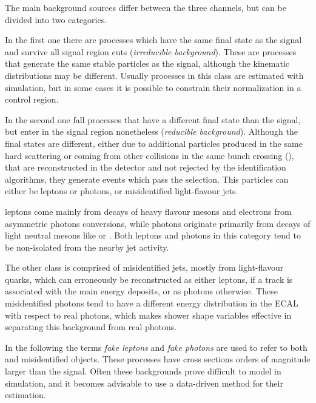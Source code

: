 \label{sec:backgrounds}
The main background sources differ between the three channels, but can be divided into two categories.

In the first one there are processes which have the same final state as the signal and survive all signal region cuts (\textit{irreducible background}).
These are processes that generate the same stable particles as the signal,
although the kinematic distributions may be different.
Usually processes in this class are estimated with simulation,
but in some cases it is possible to constrain their normalization in a control region.

In the second one fall processes that have a different final state than the signal, but enter in the signal region nonetheless (\textit{reducible background}).
Although the final states are different,
either due to additional particles produced in the same hard scattering
or coming from other collisions in the same bunch crossing (\pileup),
that are reconstructed in the detector and not rejected by the identification algorithms,
they generate events which pass the selection.
This particles can either be \nonprompt leptons or photons, or misidentified light-flavour jets.

\Nonprompt leptons come mainly from decays of heavy flavour mesons and electrons from asymmetric photons conversions,
while \nonprompt photons originate primarily from decays of light neutral mesons like \PGpz or \PGh.
Both leptons and photons in this category tend to be non-isolated from the nearby jet activity.

The other class is comprised of misidentified jets, mostly from light-flavour quarks, which can erroneously be reconstructed as either leptons,
if a track is associated with the main energy deposits, or as photons otherwise.
These misidentified photons tend to have a different energy distribution in the ECAL with respect to real photons,
which makes shower shape variables effective in separating this background from real photons.

In the following the terms \textit{fake leptons} and \textit{fake photons} are used to refer to both \nonprompt and misidentified objects.
These processes have cross sections orders of magnitude larger than the signal.
Often these backgrounds prove difficult to model in simulation,
and it becomes advisable to use a data-driven method for their estimation.

